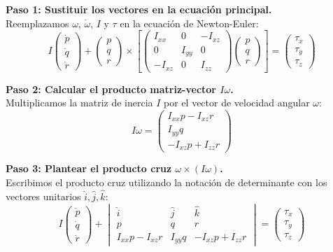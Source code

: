 \documentclass[11pt,a4paper]{article}
\begin{document}
\textbf{Paso 1: Sustituir los vectores en la ecuación principal.} \\
Reemplazamos $\omega$, $\dot{\omega}$, $I$ y $\tau$ en la ecuación de Newton-Euler:
\begin{equation*}
    I \begin{pmatrix} \dot{p} \\ \dot{q} \\ \dot{r} \end{pmatrix} +
    \begin{pmatrix} p \\ q \\ r \end{pmatrix} \times
    \left[ \begin{pmatrix} I_{xx} & 0 & -I_{xz} \\ 0 & I_{yy} & 0 \\ -I_{xz} & 0 & I_{zz} \end{pmatrix} \begin{pmatrix} p \\ q \\ r \end{pmatrix} \right] = \begin{pmatrix} \tau_x \\ \tau_y \\ \tau_z \end{pmatrix}
\end{equation*}

\vspace{0.3cm}
\textbf{Paso 2: Calcular el producto matriz-vector $I\omega$.} \\
Multiplicamos la matriz de inercia $I$ por el vector de velocidad angular $\omega$:
\begin{equation*}
    I\omega = \begin{pmatrix} I_{xx}p - I_{xz}r \\ I_{yy}q \\ -I_{xz}p + I_{zz}r \end{pmatrix}
\end{equation*}

\vspace{0.3cm}
\textbf{Paso 3: Plantear el producto cruz $\omega \times (I\omega)$.} \\
Escribimos el producto cruz utilizando la notación de determinante con los vectores unitarios $\hat{i}, \hat{j}, \hat{k}$:
\begin{equation*}
    I \begin{pmatrix} \dot{p} \\ \dot{q} \\ \dot{r} \end{pmatrix} +
    \begin{vmatrix}
    \hat{i} & \hat{j} & \hat{k} \\
    p & q & r \\
    I_{xx}p - I_{xz}r & I_{yy}q & -I_{xz}p + I_{zz}r
    \end{vmatrix} = \begin{pmatrix} \tau_x \\ \tau_y \\ \tau_z \end{pmatrix}
\end{equation*}
\end{document}
